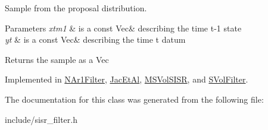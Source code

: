 Sample from the proposal distribution. 


\begin{DoxyParams}{Parameters}
{\em xtm1} & is a const Vec\& describing the time t-\/1 state \\
\hline
{\em yt} & is a const Vec\& describing the time t datum \\
\hline
\end{DoxyParams}
\begin{DoxyReturn}{Returns}
the sample as a Vec 
\end{DoxyReturn}


Implemented in \hyperlink{classNAr1Filter_af4f7f8b643e5750dc83e27ea7bf05f18}{N\+Ar1\+Filter}, \hyperlink{classJacEtAl_a2b2696527c89fdf462639e55dfbc67ce}{Jac\+Et\+Al}, \hyperlink{classMSVolSISR_a4f2f68902ba97f6dee582f1f01d1f5d7}{M\+S\+Vol\+S\+I\+SR}, and \hyperlink{classSVolFilter_a754e3c40b1db7798a48f3f4ad636b07c}{S\+Vol\+Filter}.



The documentation for this class was generated from the following file\+:\begin{DoxyCompactItemize}
\item 
include/sisr\+\_\+filter.\+h\end{DoxyCompactItemize}
